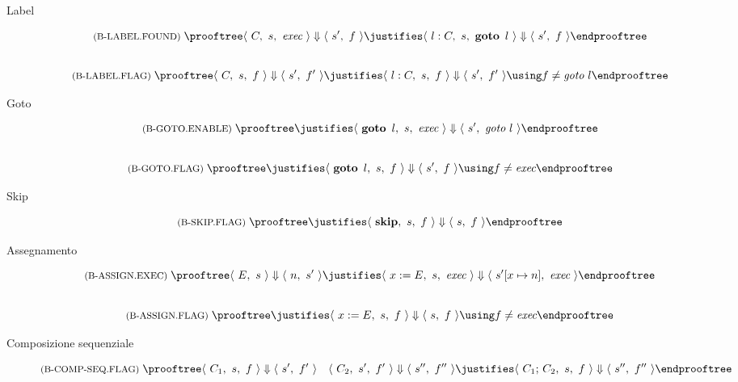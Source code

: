 \begin{description}

\item[Label]
\begin{gather*}
  \rulename{B-LABEL.FOUND}
  \prooftree
    \configG{C}{s}{\fexec} \Downarrow \config{s'}{f}
    \justifies \configG{\lab{l}{C}}{s}{\goto{l}} \Downarrow \config{s'}{f}
  \endprooftree
  \\[2em]
  \rulename{B-LABEL.FLAG}
  \prooftree
    \configG{C}{s}{f} \Downarrow \config{s'}{f'}
    \justifies \configG{\lab{l}{C}}{s}{f} \Downarrow \config{s'}{f'}
    \using f \neq \fgoto{l}
  \endprooftree
\end{gather*}

\item[Goto]
\begin{gather*}
  \rulename{B-GOTO.ENABLE}
  \prooftree
    \justifies \configG{\goto{l}}{s}{\fexec} \Downarrow \config{s'}{\fgoto{l}}
  \endprooftree
  \\[2em]
  \rulename{B-GOTO.FLAG}
  \prooftree
    \justifies \configG{\goto{l}}{s}{f} \Downarrow \config{s'}{f}
    \using f \neq \fexec
  \endprooftree  
\end{gather*}

\item[Skip]
\begin{gather*}
  \rulename{B-SKIP.FLAG}  
  \prooftree
    \justifies
      \configG{\kw{skip}}{s}{f} \Downarrow \config{s}{f}
  \endprooftree
\end{gather*}

\item[Assegnamento]
\begin{gather*}
  \rulename{B-ASSIGN.EXEC}  
  \prooftree
    \config{E}{s} \Downarrow \config{n}{s'}
    \justifies
      \configG{x:=E}{s}{\fexec} \Downarrow \config{\assign{s'}{x}{n}}{\fexec}
  \endprooftree
  \\[2em]
  \rulename{B-ASSIGN.FLAG}  
  \prooftree
    \justifies
      \configG{x:=E}{s}{f} \Downarrow \config{s}{f}
    \using f \neq \fexec
  \endprooftree
\end{gather*}

\item[Composizione sequenziale]
\begin{gather*}
  \rulename{B-COMP-SEQ.FLAG}
  \prooftree
    \configG{C_1}{s}{f} \Downarrow \config{s'}{f'}
      \quad 
      \configG{C_2}{s'}{f'} \Downarrow \config{s''}{f''}
    \justifies
      \configG{\textrm{$C_1$; $C_2$}}{s}{f} \Downarrow \config{s''}{f''}
  \endprooftree
\end{gather*}


\end{description}
